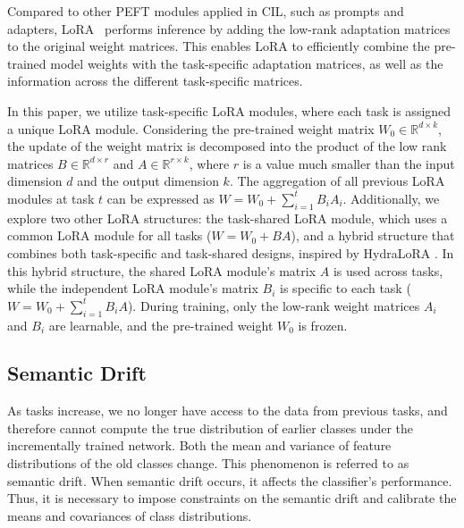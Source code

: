 Compared to other PEFT modules applied in CIL, such as prompts and adapters, LoRA~\cite{hu2022lora}  performs inference by adding the low-rank adaptation matrices to the original weight matrices. This enables LoRA to efficiently combine the pre-trained model weights with the task-specific adaptation matrices, as well as the information across the different task-specific matrices.

In this paper, we utilize task-specific LoRA modules, where each task is assigned a unique LoRA module. Considering the pre-trained weight matrix $W_0 \in \mathbb{R}^{d \times k}$, the update of the weight matrix is decomposed into the product of the low rank matrices $B \in \mathbb{R}^{d \times r}$ and $A \in \mathbb{R}^{r \times k}$, where $r$ is a value much smaller than the input dimension $d$ and the output dimension $k$.  The aggregation of all previous LoRA modules at task $t$ can be expressed as $W = W_0 + \sum_{i=1}^t B_iA_i$. Additionally, we explore two other LoRA structures: the task-shared LoRA module, which uses a common LoRA module for all tasks ($W = W_0 + BA$), and a hybrid structure that combines both task-specific and task-shared designs, inspired by HydraLoRA \cite{tian2024hydralora}. In this hybrid structure, the shared LoRA module's matrix $A$ is used across tasks, while the independent LoRA module's matrix $B_i$ is specific to each task ($W = W_0 + \sum_{i=1}^t B_iA$). During training, only the low-rank weight matrices $A_i$ and $B_i$ are learnable, and the pre-trained weight $W_0$ is frozen.
\subsection{Semantic Drift}
As tasks increase, we no longer have access to the data from previous tasks, and therefore cannot compute the true distribution of earlier classes under the incrementally trained network. Both the mean and variance of feature distributions of the old classes change. This phenomenon is referred to as semantic drift. When semantic drift occurs, it affects the classifier's performance. Thus, it is necessary to impose constraints on the semantic drift and calibrate the means and covariances of class distributions.

